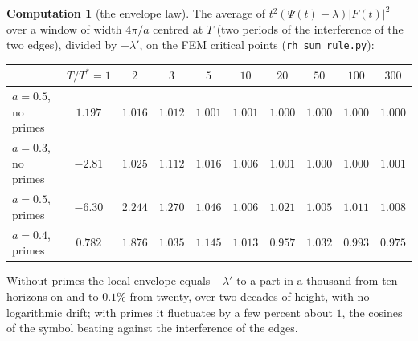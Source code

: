 \documentclass[11pt]{article}
\theoremstyle{definition}
\newtheorem{computation}[theorem]{Computation}
\theoremstyle{remark}
\newcommand{\Tst}{T^{*}}
\begin{document}
\begin{computation}[the envelope law]\label{comp:envelope}
The average of $t^2(\Psi(t)-\lambda)|F(t)|^2$ over a window of width $4\pi/a$ centred at $T$ (two periods of the interference of the two edges), divided by $-\lambda'$, on the FEM critical points (\texttt{rh\_sum\_rule.py}):
\begin{center}\footnotesize
\begin{tabular}{@{}lccccccccc@{}}
\toprule
& $T/\Tst=1$ & $2$ & $3$ & $5$ & $10$ & $20$ & $50$ & $100$ & $300$\\
\midrule
$a=0.5$, no primes & $1.197$ & $1.016$ & $1.012$ & $1.001$ & $1.001$ & $1.000$ & $1.000$ & $1.000$ & $1.000$\\
$a=0.3$, no primes & $-2.81$ & $1.025$ & $1.112$ & $1.016$ & $1.006$ & $1.001$ & $1.000$ & $1.000$ & $1.001$\\
$a=0.5$, primes & $-6.30$ & $2.244$ & $1.270$ & $1.046$ & $1.006$ & $1.021$ & $1.005$ & $1.011$ & $1.008$\\
$a=0.4$, primes & $0.782$ & $1.876$ & $1.035$ & $1.145$ & $1.013$ & $0.957$ & $1.032$ & $0.993$ & $0.975$\\
\bottomrule
\end{tabular}
\end{center}
Without primes the local envelope equals $-\lambda'$ to a part in a thousand from ten horizons on and to $0.1\%$ from twenty, over two decades of height, with no logarithmic drift; with primes it fluctuates by a few percent about $1$, the cosines of the symbol beating against the interference of the edges.
\end{computation}
\end{document}
